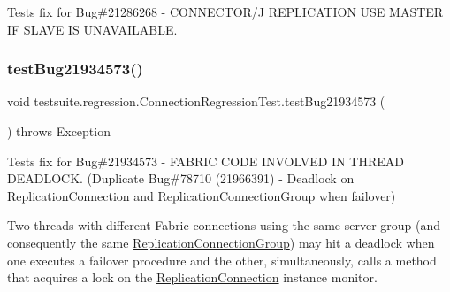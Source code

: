 Tests fix for Bug\#21286268 -\/ C\+O\+N\+N\+E\+C\+T\+O\+R/J R\+E\+P\+L\+I\+C\+A\+T\+I\+ON U\+SE M\+A\+S\+T\+ER IF S\+L\+A\+VE IS U\+N\+A\+V\+A\+I\+L\+A\+B\+LE. \mbox{\label{classtestsuite_1_1regression_1_1_connection_regression_test_a1cbe215e0e75477350d50bfaa49af95e}} 
\subsubsection{\texorpdfstring{test\+Bug21934573()}{testBug21934573()}}
{\footnotesize\ttfamily void testsuite.\+regression.\+Connection\+Regression\+Test.\+test\+Bug21934573 (\begin{DoxyParamCaption}{ }\end{DoxyParamCaption}) throws Exception}

Tests fix for Bug\#21934573 -\/ F\+A\+B\+R\+IC C\+O\+DE I\+N\+V\+O\+L\+V\+ED IN T\+H\+R\+E\+AD D\+E\+A\+D\+L\+O\+CK. (Duplicate Bug\#78710 (21966391) -\/ Deadlock on Replication\+Connection and Replication\+Connection\+Group when failover)

Two threads with different Fabric connections using the same server group (and consequently the same \mbox{\hyperlink{}{Replication\+Connection\+Group}}) may hit a deadlock when one executes a failover procedure and the other, simultaneously, calls a method that acquires a lock on the \mbox{\hyperlink{}{Replication\+Connection}} instance monitor.

